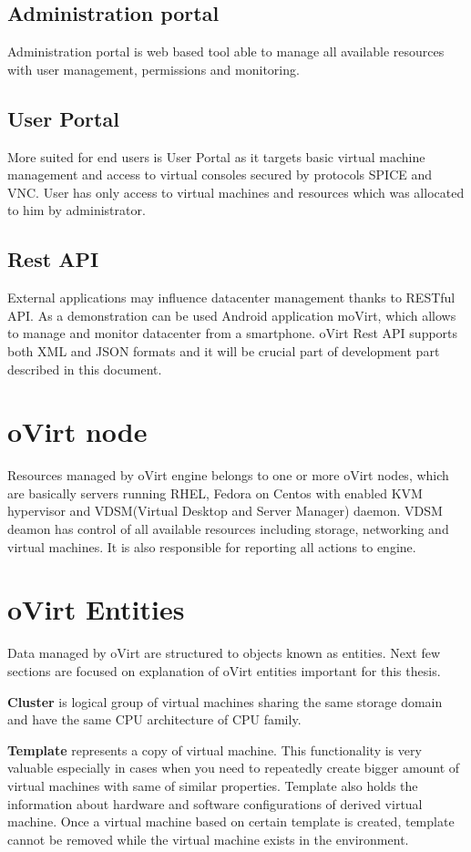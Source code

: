\subsection{Administration portal}
Administration portal is web based tool able to manage all available resources with user management, permissions and monitoring. 

\subsection{User Portal}
More suited for end users is User Portal as it targets basic virtual machine management and access to virtual consoles secured by protocols SPICE\cite{SPICE} and VNC\cite{VNC}. User has only access to virtual machines and resources which was allocated to him by administrator.

\subsection{Rest API}
External applications may influence datacenter management thanks to RESTful API. As a demonstration can be used Android application moVirt, which allows to manage and monitor datacenter from a smartphone. oVirt Rest API supports both XML and JSON formats and it will be crucial part of development part described in this document.

\section{oVirt node}
Resources managed by oVirt engine belongs to one or more oVirt nodes, which are basically servers running RHEL, Fedora on Centos with enabled KVM hypervisor and VDSM(Virtual Desktop and Server Manager) daemon. VDSM deamon has control of all available resources including storage, networking and virtual machines. It is also responsible for reporting all actions to engine.

\section{oVirt Entities}
Data managed by oVirt are structured to objects known as entities. Next few sections are focused on explanation of oVirt entities important for this thesis.

\textbf{Cluster} is logical group of virtual machines sharing the same storage domain and have the same CPU architecture of CPU family.

\textbf{Template} represents a copy of virtual machine. This functionality is very valuable especially in cases when you need to repeatedly create bigger amount of virtual machines with same of similar properties. Template also holds the information about hardware and software configurations of derived virtual machine. Once a virtual machine based on certain template is created, template cannot be removed while the virtual machine exists in the environment. 

